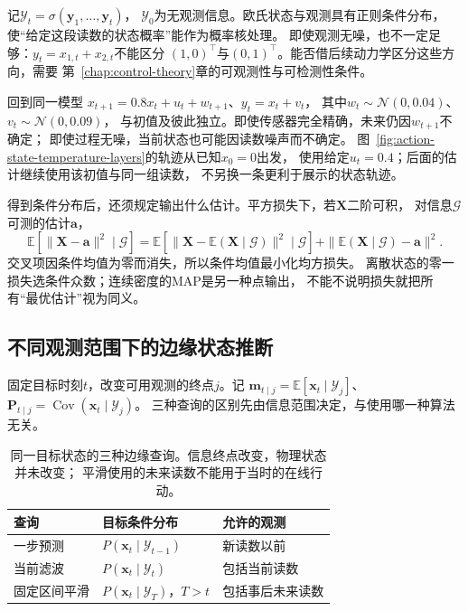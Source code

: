 记$\mathcal Y_t=\sigma(\bm y_1,\ldots,\bm y_t)$，
$\mathcal Y_0$为无观测信息。欧氏状态与观测具有正则条件分布，
使“给定这段读数的状态概率”能作为概率核处理。
即使观测无噪，也不一定足够：$y_t=x_{1,t}+x_{2,t}$不能区分
$(1,0)^\top$与$(0,1)^\top$。能否借后续动力学区分这些方向，需要
第~\ref{chap:control-theory}章的可观测性与可检测性条件。

\begin{example}[带泄漏温度的间接观测]
 \label{ex:dynamical-noisy-temperature}
 回到同一模型
 $x_{t+1}=0.8x_t+u_t+w_{t+1}$、$y_t=x_t+v_t$，
 其中$w_t\sim\mathcal N(0,0.04)$、$v_t\sim\mathcal N(0,0.09)$，
 与初值及彼此独立。即使传感器完全精确，未来仍因$w_{t+1}$不确定；
 即使过程无噪，当前状态也可能因读数噪声而不确定。
 图~\ref{fig:action-state-temperature-layers}的轨迹从已知$x_0=0$出发，
 使用给定$u_t=0.4$；后面的估计继续使用该初值与同一组读数，
 不另换一条更利于展示的状态轨迹。
\end{example}

得到条件分布后，还须规定输出什么估计。平方损失下，若$\bm X$二阶可积，
对信息$\mathcal G$可测的估计$\bm a$，
\[
 \mathbb E[\|\bm X-\bm a\|^2\mid\mathcal G]
 =\mathbb E[\|\bm X-\mathbb E(\bm X\mid\mathcal G)\|^2\mid\mathcal G]
       +\|\mathbb E(\bm X\mid\mathcal G)-\bm a\|^2.
\]
交叉项因条件均值为零而消失，所以条件均值最小化均方损失。
离散状态的零一损失选条件众数；连续密度的MAP是另一种点输出，
不能不说明损失就把所有“最优估计”视为同义。

\subsection{不同观测范围下的边缘状态推断}
\label{sec:dynamical-kalman-rts}

固定目标时刻$t$，改变可用观测的终点$j$。记
$\bm m_{t\mid j}=\mathbb E[\bm x_t\mid\mathcal Y_j]$、
$\bm P_{t\mid j}=\operatorname{Cov}(\bm x_t\mid\mathcal Y_j)$。
三种查询的区别先由信息范围决定，与使用哪一种算法无关。

\begin{table}[htbp]
 \centering
 \begin{tabularx}{\linewidth}{lXX}
 \toprule
 查询 & 目标条件分布 & 允许的观测\\
 \midrule
 一步预测 & $P(\bm x_t\mid\mathcal Y_{t-1})$ & 新读数以前\\
 当前滤波 & $P(\bm x_t\mid\mathcal Y_t)$ & 包括当前读数\\
 固定区间平滑 & $P(\bm x_t\mid\mathcal Y_T)$，$T>t$ & 包括事后未来读数\\
 \bottomrule
 \end{tabularx}
 \caption{同一目标状态的三种边缘查询。信息终点改变，物理状态并未改变；
 平滑使用的未来读数不能用于当时的在线行动。}
 \label{tab:dynamical-estimation-information}
\end{table}

